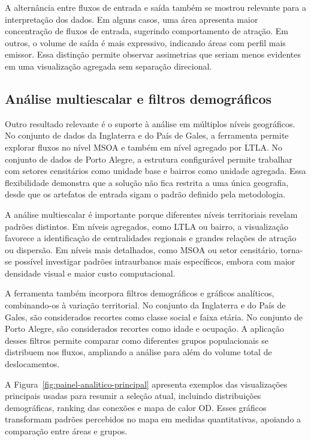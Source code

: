 \documentclass[12pt]{article}
\begin{document}
A alternância entre fluxos de entrada e saída também se mostrou relevante para a interpretação dos dados. Em alguns casos, uma área apresenta maior concentração de fluxos de entrada, sugerindo comportamento de atração. Em outros, o volume de saída é mais expressivo, indicando áreas com perfil mais emissor. Essa distinção permite observar assimetrias que seriam menos evidentes em uma visualização agregada sem separação direcional.

\subsection{Análise multiescalar e filtros demográficos}

Outro resultado relevante é o suporte à análise em múltiplos níveis geográficos. No conjunto de dados da Inglaterra e do País de Gales, a ferramenta permite explorar fluxos no nível MSOA e também em nível agregado por LTLA. No conjunto de dados de Porto Alegre, a estrutura configurável permite trabalhar com setores censitários como unidade base e bairros como unidade agregada. Essa flexibilidade demonstra que a solução não fica restrita a uma única geografia, desde que os artefatos de entrada sigam o padrão definido pela metodologia.

A análise multiescalar é importante porque diferentes níveis territoriais revelam padrões distintos. Em níveis agregados, como LTLA ou bairro, a visualização favorece a identificação de centralidades regionais e grandes relações de atração ou dispersão. Em níveis mais detalhados, como MSOA ou setor censitário, torna-se possível investigar padrões intraurbanos mais específicos, embora com maior densidade visual e maior custo computacional.

A ferramenta também incorpora filtros demográficos e gráficos analíticos, combinando-os à variação territorial. No conjunto da Inglaterra e do País de Gales, são considerados recortes como classe social e faixa etária. No conjunto de Porto Alegre, são considerados recortes como idade e ocupação. A aplicação desses filtros permite comparar como diferentes grupos populacionais se distribuem nos fluxos, ampliando a análise para além do volume total de deslocamentos.

A Figura~\ref{fig:painel-analitico-principal} apresenta exemplos das visualizações principais usadas para resumir a seleção atual, incluindo distribuições demográficas, ranking das conexões e mapa de calor OD. Esses gráficos transformam padrões percebidos no mapa em medidas quantitativas, apoiando a comparação entre áreas e grupos.
\end{document}
